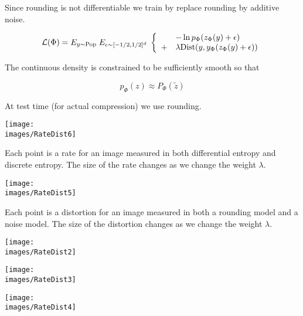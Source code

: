 {Since rounding is not differentiable we train by replace rounding by additive noise.

\vfill
{\color{red} $${\cal L}(\Phi) = E_{y \sim \mathrm{Pop}}\;E_{\epsilon \sim [-1/2,1/2]^d} \;\left\{\begin{array}{ll} &- \ln p_\Phi(z_\Phi(y) + \epsilon) \\
+ & \lambda \mathrm{Dist}(y,y_\Phi(z_\Phi(y) + \epsilon)) \end{array}\right.$$}

The continuous density is constrained to be sufficiently smooth so that

{\color{red} $$p_\Phi(z) \approx P_\Phi(\tilde{z})$$}

\vfill
At test time (for actual compression) we use rounding.


\bigskip
\centerline{\texttt{[image: \\images/RateDist6]}}

Each point is a rate for an image measured in both differential entropy and discrete entropy.  The size of the rate changes as we change the weight $\lambda$.


\centerline{\texttt{[image: \\images/RateDist5]}}

Each point is a distortion for an image measured in both a rounding model and a noise model.  The size of the distortion changes as we change the weight $\lambda$.


\bigskip
\centerline{\texttt{[image: \\images/RateDist2]}}


\bigskip
\centerline{\texttt{[image: \\images/RateDist3]}}


\bigskip
\centerline{\texttt{[image: \\images/RateDist4]}}


}

